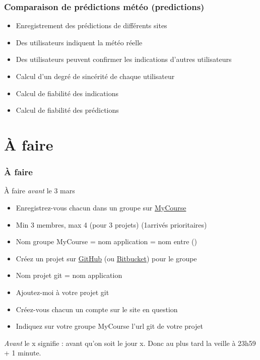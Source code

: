 \documentclass[english, french]{beamer}
\begin{document}
\begin{frame}
	\frametitle{Comparaison de prédictions météo (predictions)}
	\begin{itemize}
		\item Enregistrement des prédictions de différents sites
		\item Des utilisateurs indiquent la météo réelle
		\item Des utilisateurs peuvent confirmer les indications d’autres utilisateurs
		\item Calcul d’un degré de sincérité de chaque utilisateur
		\item Calcul de fiabilité des indications
		\item Calcul de fiabilité des prédictions
	\end{itemize}
\end{frame}

\section{À faire}
\begin{frame}
	\frametitle{À faire}
	\begin{block}{À faire \emph{avant} le 3 mars}
		\begin{itemize}
			\item Enregistrez-vous chacun dans un groupe sur \href{https://mycourse.dauphine.fr/webapps/blackboard/execute/launcher?type=Course&id=_35222_1}{MyCourse}
			\item Min 3 membres, max 4 {\tiny (pour 3 projets)} (1\iers arrivés prioritaires)
			\item Nom groupe MyCourse = nom application = nom entre ()
			\item Créez un projet sur \href{https://github.com/}{GitHub} (ou \href{https://bitbucket.org/}{Bitbucket}) pour le groupe
			\item Nom projet git = nom application
			\item Ajoutez-moi à votre projet git
			\item Créez-vous chacun un compte sur le site en question
			\item Indiquez sur votre groupe MyCourse l’url git de votre projet
		\end{itemize}
	\end{block}
	\emph{Avant} le x signifie : avant qu’on soit le jour x. Donc au plus tard la veille à 
	23h59 + 1 minute.
\end{frame}
\end{document}
